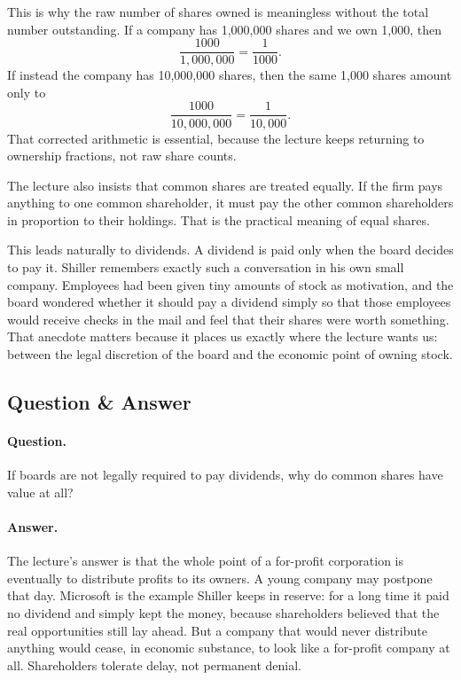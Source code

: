 This is why the raw number of shares owned is meaningless without the total number outstanding. If a company has 1,000,000 shares and we own 1,000, then
\[
\frac{1000}{1{,}000{,}000} = \frac{1}{1000}.
\]
If instead the company has 10,000,000 shares, then the same 1,000 shares amount only to
\[
\frac{1000}{10{,}000{,}000} = \frac{1}{10{,}000}.
\]
That corrected arithmetic is essential, because the lecture keeps returning to ownership fractions, not raw share counts.

The lecture also insists that common shares are treated equally. If the firm pays anything to one common shareholder, it must pay the other common shareholders in proportion to their holdings. That is the practical meaning of equal shares.

This leads naturally to dividends. A dividend is paid only when the board decides to pay it. Shiller remembers exactly such a conversation in his own small company. Employees had been given tiny amounts of stock as motivation, and the board wondered whether it should pay a dividend simply so that those employees would receive checks in the mail and feel that their shares were worth something. That anecdote matters because it places us exactly where the lecture wants us: between the legal discretion of the board and the economic point of owning stock.

\subsection{Question \& Answer}

\paragraph{Question.} If boards are not legally required to pay dividends, why do common shares have value at all?

\paragraph{Answer.} The lecture's answer is that the whole point of a for-profit corporation is eventually to distribute profits to its owners. A young company may postpone that day. Microsoft is the example Shiller keeps in reserve: for a long time it paid no dividend and simply kept the money, because shareholders believed that the real opportunities still lay ahead. But a company that would never distribute anything would cease, in economic substance, to look like a for-profit company at all. Shareholders tolerate delay, not permanent denial.

